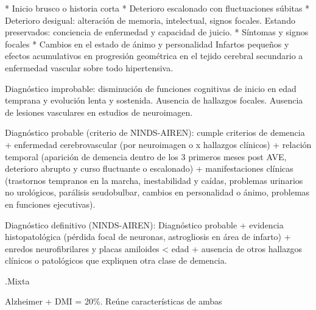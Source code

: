 \documentclass[encares.tex]{subfiles}
\begin{document}
* Inicio brusco o historia corta
* Deterioro escalonado con fluctuaciones súbitas
* Deterioro desigual: alteración de memoria, intelectual, signos focales. Estando preservados: conciencia de enfermedad y capacidad de juicio.
* Síntomas y signos focales
* Cambios en el estado de ánimo y personalidad Infartos pequeños y efectos acumulativos en progresión geométrica en el tejido cerebral secundario a enfermedad vascular sobre todo hipertensiva.

Diagnóstico improbable: disminución de funciones cognitivas de inicio en edad temprana y evolución lenta y sostenida. Ausencia de hallazgos focales. Ausencia de lesiones vasculares en estudios de neuroimagen.

Diagnóstico probable (criterio de NINDS-AIREN): cumple criterios de demencia + enfermedad cerebrovascular (por neuroimagen o x hallazgos clínicos) + relación temporal (aparición de demencia dentro de los 3 primeros meses post AVE, deterioro abrupto y curso fluctuante o escalonado) + manifestaciones clínicas (trastornos tempranos en la marcha, inestabilidad y caídas, problemas urinarios no urológicos, parálisis seudobulbar, cambios en personalidad o ánimo, problemas en funciones ejecutivas).

Diagnóstico definitivo (NINDS-AIREN): Diagnóstico probable + evidencia histopatológica (pérdida focal de neuronas, astrogliosis en área de infarto) + enredos neurofibrilares y placas amiloides < edad + ausencia de otros hallazgos clínicos o patológicos que expliquen otra clase de demencia.

.Mixta

Alzheimer + DMI = 20\%. Reúne características de ambas
\end{document}
